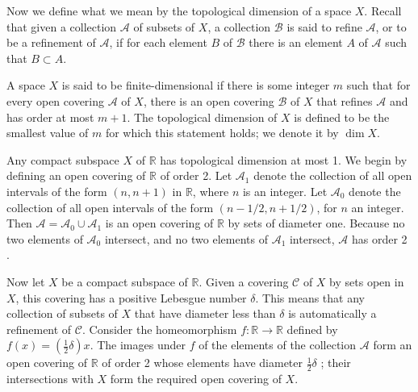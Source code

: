 Now we define what we mean by the topological dimension of a space \(X\). Recall that given a collection \(\mathcal{A}\) of subsets of \(X\), a collection \(\mathcal{B}\) is said to refine \(\mathcal{A}\), or to be a refinement of \(\mathcal{A}\), if for each element \(B\) of \(\mathcal{B}\) there is an element \(A\) of \(\mathcal{A}\) such that \(B \subset A\).

\begin{definition}
A space \(X\) is said to be finite-dimensional if there is some integer \(m\) such that for every open covering \(\mathcal{A}\) of \(X\), there is an open covering \(\mathcal{B}\) of \(X\) that refines \(\mathcal{A}\) and has order at most \(m + 1\). The topological dimension of \(X\) is defined to be the smallest value of \(m\) for which this statement holds; we denote it by \(\dim X\).
\end{definition}

\begin{centeredblock}
\begin{example}
\label{ex:\thesection.\theexample}
Any compact subspace \(X\) of \(\mathbb{R}\) has topological dimension at most 1. We begin by defining an open covering of \(\mathbb{R}\) of order 2. Let \(\mathcal{A}_{1}\) denote the collection of all open intervals of the form \(({n,n + 1})\) in \(\mathbb{R}\), where \(n\) is an integer. Let \(\mathcal{A}_{0}\) denote the collection of all open intervals of the form \(({n - 1/2,n + 1/2})\), for \(n\) an integer. Then \(\mathcal{A} = \mathcal{A}_{0} \cup {\mathcal{A}}_{1}\) is an open covering of \(\mathbb{R}\) by sets of diameter one. Because no two elements of \(\mathcal{A}_{0}\) intersect, and no two elements of \(\mathcal{A}_{1}\) intersect, \(\mathcal{A}\) has order 2 .

Now let \(X\) be a compact subspace of \(\mathbb{R}\). Given a covering \(\mathcal{C}\) of \(X\) by sets open in \(X\), this covering has a positive Lebesgue number \(\delta\). This means that any collection of subsets of \(X\) that have diameter less than \(\delta\) is automatically a refinement of \(\mathcal{C}\). Consider the homeomorphism \(f : \mathbb{R} \rightarrow \mathbb{R}\) defined by \(f(x) = ({\frac{1}{2}\delta }) x\). The images under \(f\) of the elements of the collection \(\mathcal{A}\) form an open covering of \(\mathbb{R}\) of order 2 whose elements have diameter \(\frac{1}{2}\delta\) ; their intersections with \(X\) form the required open covering of \(X\).
\end{example}
\end{centeredblock}

